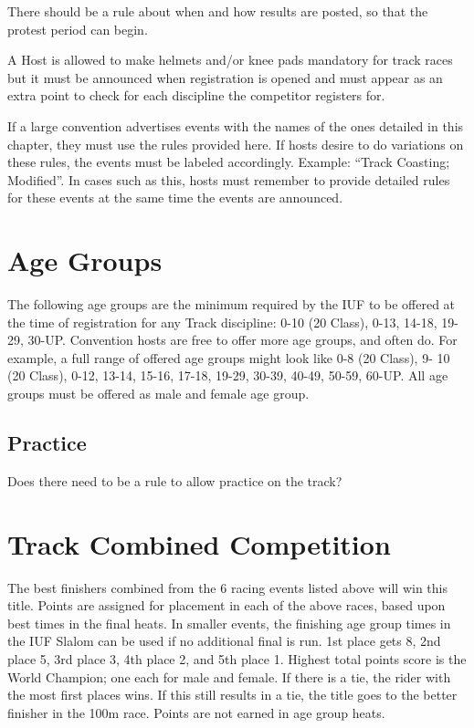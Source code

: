 \begin{comment2016}
There should be a rule about when and how results are posted, so that the
protest period can begin.
\end{comment2016}

A Host is allowed to make helmets and/or knee pads mandatory for track races but it must be announced when registration is opened and must appear as an extra point to check for each discipline the competitor registers for.

If a large convention advertises events with the names of the ones detailed in this chapter, they must use the rules provided here.
If hosts desire to do variations on these rules, the events must be labeled accordingly.
Example: ``Track Coasting; Modified''.
In cases such as this, hosts must remember to provide detailed rules for these events at the same time the events are announced.

\section{Age Groups \label{subsec:track_racing-categories_age-groups}}
The following age groups are the minimum required by the IUF to be offered at the time of registration for any Track discipline: 0-10 (20 Class), 0-13, 14-18, 19-29, 30-UP.
Convention hosts are free to offer more age groups, and often do.
For example, a full range of offered age groups might look like 0-8 (20 Class), 9- 10 (20 Class), 0-12, 13-14, 15-16, 17-18, 19-29, 30-39, 40-49, 50-59, 60-UP.
All age groups must be offered as male and female age group.

\begin{comment2016}
\section{Practice}

Does there need to be a rule to allow practice on the track?
\end{comment2016}

\section{Track Combined Competition}%
The best finishers combined from the 6 racing events listed above will win this title.
Points are assigned for placement in each of the above races, based upon best times in the final heats.
In smaller events, the finishing age group times in the IUF Slalom can be used if no additional final is run.
1st place gets 8, 2nd place 5, 3rd place 3, 4th place 2, and 5th place 1.
Highest total points score is the World Champion; one each for male and female.
If there is a tie, the rider with the most first places wins.
If this still results in a tie, the title goes to the better finisher in the 100m race.
Points are not earned in age group heats.

